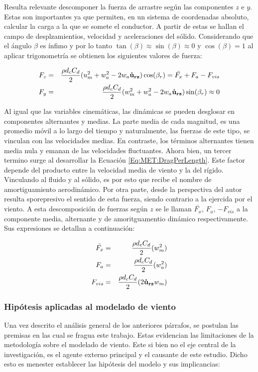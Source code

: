 Resulta relevante descomponer la fuerza de arrastre según las componentes $z$ e $y$. Estas son importantes ya que permiten, en un sistema de coordenadas absoluto, calcular la carga a la que se somete el conductor. A partir de estas se hallan el campo de desplzamientios, velocidad y aceleraciones del sólido. Considerando que el ángulo $\beta$ es ínfimo y por lo tanto $\tan(\beta)\approx\sin(\beta)\approx 0$ y $\cos(\beta)=1$ al aplicar trigonometría se obtienen los siguientes valores de fuerza:

\begin{eqnarray}
	F_z &=& \frac{\rho d_c C_d}{2} (u_m^2+w_a^2-2 w_a \text{$\bf{\dot{u}}_{rz}$})\cos(\beta_r)=\bar{F_x}+F_a-F_{vis}\\
	F_y &=& \frac{\rho d_c C_d}{2} (w_m^2+w_a^2-2 w_a \text{$\bf{\dot{u}}_{rz}$})\sin(\beta_r)\approx 0
\end{eqnarray}

Al igual que las variables cinemáticas, las dinámicas se pueden desglosar en componentes alternantes y medias. La parte media de cada magnitud, es una promedio móvil a lo largo del tiempo y naturalmente, las fuerzas de este tipo, se vinculan con las velocidades medias. En contraste, los términos alternantes tienen media nula y emanan de las velocidades fluctuantes. Ahora bien, un tercer termino surge al desarrollar la Ecuación \eqref{Eq:MET:DragPerLength}. Este factor depende del producto entre la velocidad media de viento y la del rígido. Vinculando al fluido y al sólido, es por esto que recibe el nombre de amortiguamiento aerodinámico. Por otra parte, desde la perspectiva del autor resulta sporepresivo el sentido de esta fuerza, siendo contrario a la ejercida por el viento.  A esta descomposición de fuerzas según $z$ se le llaman $\bar{F_x}$, $F_a$, $-F_{vis}$ a la componente media, alternante y de amoritguamentio dinámico respectivamente. Sus expresiones se detallan a continuación: 

\begin{eqnarray}
	\bar{F_x} &=&  \frac{\rho d_c C_d}{2} (w_m^2)\\
	F_a &=&  \frac{\rho d_c C_d}{2} (w_a^2)\\
	\label{Eq:MET:AmortAerodniamic}
	F_{vis}  &=& \frac{\rho d_c C_d}{2} (2 \text{$\bf{\dot{u}}_{rz}$} w_m)
\end{eqnarray}

\subsubsection{Hipótesis aplicadas al modelado de viento} \label{Sec:MET:HipotesisdeTrabajo}
Una vez descrito el análisis general de los anteriores párrafos, se postulan las premisas en las cual se fragua este trabajo. Estas evidencian las limitaciones de la metodología sobre el modelado de viento. Este si bien no el eje central de la investigación, es el agente externo principal y el causante de este estudio. Dicho esto es menester establecer las hipótesis del modelo y sus implicancias:

